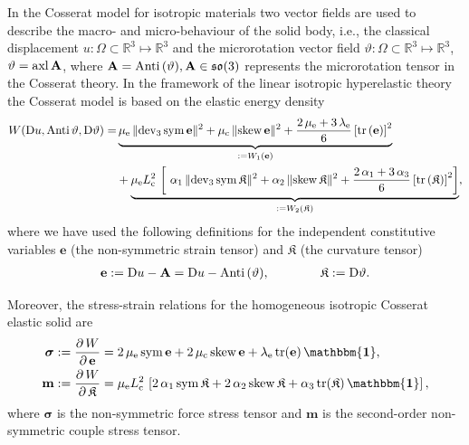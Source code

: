 \documentclass[10pt]{article}
\newcommand{\id}{{\mathbf{\mathbbm{1}}}}
\newcommand{\tr}{{\rm tr}}
\newcommand{\dev}{{\rm dev}}
\newcommand{\sym}{{\rm sym}}
\newcommand{\skw}{{\rm skew}}
\begin{document}
In the Cosserat model for isotropic materials two vector fields are used to describe the macro- and micro-behaviour of the solid body, i.e.,  
the  {classical} displacement $u:\Omega \subset\mathbb{R}^3\mapsto\mathbb{R}^3$ and the   microrotation vector field $ \vartheta   :\Omega \subset\mathbb{R}^3\mapsto\mathbb{R}^3$, $ \vartheta   ={\rm axl}\, \mathbf{A}$, where { $\mathbf{A}={\rm Anti}\, (\vartheta), \mathbf{A}\in \mathfrak{so}(3)$} represents the microrotation tensor in the  Cosserat theory. In the framework of the linear isotropic hyperelastic theory the Cosserat model is  based on the elastic energy density   \cite{NeffGhibaMicroModel,MadeoNeffGhibaW,MadeoNeffGhibaWZAMM,madeo2016reflection,NeffGhibaMadeoLazar}
 \begin{align}\label{energy}
 	W(\mathrm{D}u ,{\rm Anti}\, \vartheta , \mathrm{D} \vartheta    )=& \underbrace{\mu_{\rm e} \,\lVert \dev_3\, \sym\,\mathbf{e}\rVert ^{2}+\mu_{\rm c}\,\lVert \skw\,\mathbf{e}\rVert ^{2}+\frac{2\,\mu_{\rm e} +3\,\lambda_{\rm e} }{6}\left[\mathrm{tr} \left(\mathbf{e}\right)\right]^{2}}_{:=W_1(\mathbf{e})}\notag\\& +\underbrace{{\mu_{\rm e}L_{\rm c}^2}\,\left[\ {\alpha_1}\,\lVert \dev_3\,\sym\,\mathbf{\mathfrak{K}}\rVert ^{2}+{\alpha_2}\,\lVert \skw\,\mathbf{\mathfrak{K}}\rVert ^{2}+\frac{2\,\alpha_1+3\,\alpha_3}{6}\left[\mathrm{tr} \left(\mathbf{\mathfrak{K}}\right)\right]^{2}\right]}_{:=W_2(\mathbf{\mathfrak{K}})},
 \end{align}
 where  we have used the following definitions for the independent constitutive  variables $\mathbf{e}$  (the non-symmetric strain tensor) and $\mathbf{\mathfrak{K}}$ (the curvature tensor) \begin{align}
 	\mathbf{e}:=\mathrm{D}u -\mathbf{A}=\mathrm{D}u -{\rm Anti}\, (\vartheta)   , \qquad \qquad \mathbf{\mathfrak{K}}:=\mathrm{D} \vartheta.
 \end{align}
 
 Moreover, the stress-strain relations for the homogeneous  isotropic Cosserat elastic solid are
 \begin{align}\label{01}
 	\boldsymbol{\sigma}&:=\frac{\partial\, W}{\partial\, \mathbf{e}}=2\,\mu_{\rm e} \, \sym \,\mathbf{e}+2\,\mu_{\rm c} \, \skw\, \mathbf{e}+\lambda_{\rm e} \,\tr (\mathbf{e})\, \id,\notag\\ 
 	\mathbf{ m}&:=\frac{\partial\, W}{\partial\, \mathbf{\mathfrak{K}}} ={\mu_{\rm e}L_{\rm c}^2}\,\left[2\,{\alpha_1}\, \sym\,\mathbf{\mathfrak{K}} +2\,{\alpha_2}\,\skw\, \mathbf{\mathfrak{K}}+\alpha_3\,\tr(\mathbf{\mathfrak{K}})\,\id\right],
 \end{align}
 where $\boldsymbol{\sigma}$ is the non-symmetric force stress tensor and $\mathbf{m}$ is the second-order non-symmetric couple stress tensor. 
 
\end{document}

